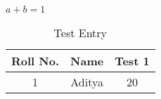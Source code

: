 \documentclass[12pt,a4paper,final,oneside]{report}
\begin{document}
$ a+b=1 $


\begin{table}[h]
	
	\begin{center}
		\begin{tabular}{|c|c|c|}
			\hline Roll No. & Name & Test 1 \\ 
			\hline 1 & Aditya & 20 \\ 
			\hline 
		\end{tabular} 
		
		
	\end{center}
	
	\caption{Test Entry}
\end{table}
\end{document}
